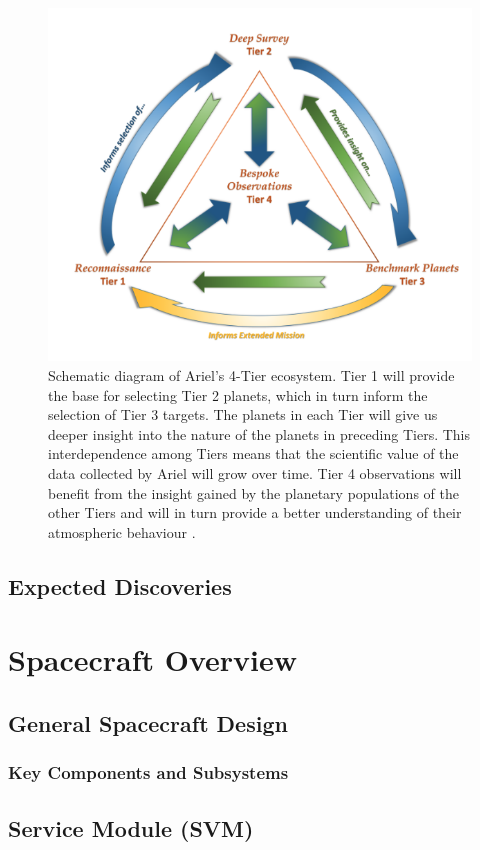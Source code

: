 \documentclass[12pt]{article}
\begin{document}
\begin{figure}
    \centering
    \includegraphics[width=.55\textwidth]{tiers ariel.png}
    \caption{Schematic diagram of Ariel's 4-Tier ecosystem. Tier 1 will provide the base for selecting Tier 2 planets, which in turn inform the selection of Tier 3 targets. The planets in each Tier will give us deeper insight into the nature of the planets in preceding Tiers. This interdependence among Tiers means that the
    scientific value of the data collected by Ariel will grow over time. Tier 4 observations will benefit from the insight gained by the planetary populations of the other Tiers and will in turn provide a better understanding of their atmospheric behaviour \protect\cite[p. 40]{arielstudyreport}.}
    \label{fig:5}
\end{figure}

\subsection{Expected Discoveries}

\newpage

\section{Spacecraft Overview}

\subsection{General Spacecraft Design}


\subsubsection{Key Components and Subsystems}


\subsection{Service Module (SVM)}
\end{document}
